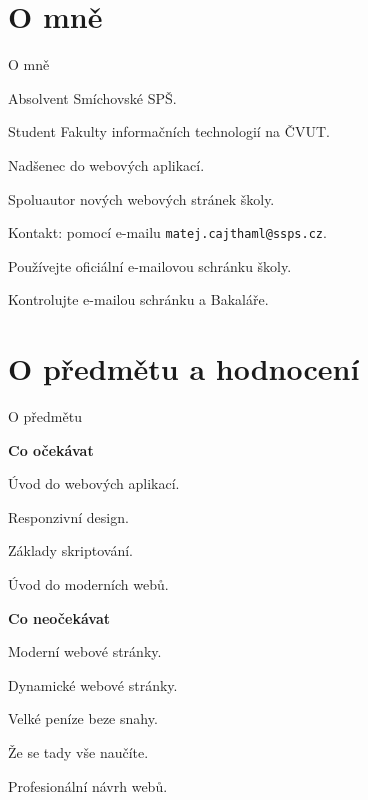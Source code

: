 \documentclass[aspectratio=1610]{beamer}
\begin{document}
\section{O mně}

\begin{frame}{O mně}
    \begin{cardTiny}
        Absolvent Smíchovské SPŠ.
        
        Student Fakulty informačních technologií na ČVUT.

        Nadšenec do webových aplikací.

        Spoluautor nových webových stránek školy.
    \end{cardTiny}
    \begin{cardTiny}
        Kontakt: pomocí e-mailu \texttt{matej.cajthaml@ssps.cz}.

        Používejte oficiální e-mailovou schránku školy.

        Kontrolujte e-mailou schránku a Bakaláře.
    \end{cardTiny}
\end{frame}



\section{O předmětu a hodnocení}

\begin{frame}{O předmětu}
    \begin{multicols}{2}
        \centering
        
        \begin{cardTiny}
            \textbf{Co očekávat}
        
            \begin{flushleft}
            Úvod do webových aplikací.
            
            Responzivní design.

            Základy skriptování.
        
            Úvod do moderních webů.
            \end{flushleft}
        \end{cardTiny}
        
        \begin{cardTiny}
            \textbf{Co neočekávat}
            
            \begin{flushleft}
            Moderní webové stránky.

            Dynamické webové stránky.
            
            Velké peníze beze snahy.

            Že se tady vše naučíte.

            Profesionální návrh webů.
            \end{flushleft}
        \end{cardTiny}
    \end{multicols}
\end{frame}
\end{document}
